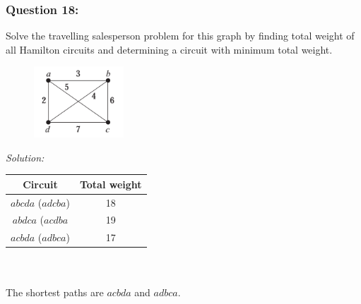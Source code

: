 \documentclass[a4paper]{article}
\begin{document}
	\subsubsection*{Question 18:}
	Solve the travelling salesperson problem for this graph by finding total weight of all Hamilton circuits and determining a circuit with minimum total weight.
	\begin{figure}[H]
		\centering
		\includegraphics[width=0.3\textwidth]{tut918.png}
	\end{figure}
	\emph{Solution:} \\
	
	\begin{tabular}{|c|c|}
		\hline
		Circuit           & Total weight \\
		\hline
		$abcda$ ($adcba$) & 18           \\
		\hline
		$abdca$ ($acdba$  & 19           \\
		\hline
		$acbda$ ($adbca$) & 17           \\
		\hline
	\end{tabular}
	\\ \\
	The shortest paths are $acbda$ and $adbca$.
	
\end{document}
